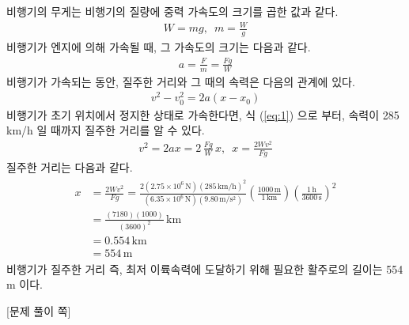\documentclass[floatfix,nofootinbib,superscriptaddress,fleqn,preprint]{revtex4}
\begin{document}
 비행기의 무게는 비행기의 질량에 중력 가속도의 크기를
곱한 값과 같다.
\begin{align}
  W=mg,\,\,\,m=\frac{W}{g}
\end{align}
비행기가 엔지에 의해 가속될 때, 그 가속도의 크기는 다음과 같다.
\begin{align}
  a=\frac{F}{m}=\frac{Fg}{W}
\end{align}
비행기가 가속되는 동안, 질주한 거리와 그 때의 속력은 
다음의 관계에 있다.
\begin{align}\label{eq:1}
 v^2-v^2_0 = 2a(x-x_0) 
\end{align}
비행기가 초기 위치에서 정지한 상태로 가속한다면, 식 (\ref{eq:1}) 으로
부터, 속력이 285 km/h 일 때까지 질주한 거리를 알 수 있다.
\begin{align}
    v^2 = 2ax = 2\,\frac{Fg}{W}\,x,\,\,\,
    x=\frac{2Wv^2}{Fg}
\end{align}
질주한 거리는 다음과 같다.
\begin{align}
  \begin{split}
    x&=\frac{2Wv^2}{Fg}
    =\frac{2(2.75\times 10^6\,\mathrm{N}){(285\,\mathrm{km/h})}^2}
    {(6.35\times 10^6\,\mathrm{N})(9.80\,\mathrm{m/s^2})}
    \left(\frac{1000\,\mathrm{m}}{1\,\mathrm{km}}\right)
    \left(\frac{1\,\mathrm{h}}{3600\,\mathrm{s}}\right)^2 \\
    &=\frac{(7180)(1000)}{(3600)^2}\,\mathrm{km}  \\
    &=0.554\,\mathrm{km} \\
    &= 554\,\mathrm{m}
  \end{split}
\end{align}
비행기가 질주한 거리 즉, 최저 이륙속력에 도달하기 위해 필요한 
활주로의 길이는 554 m 이다.
\newpage

{\color{gray} [문제 풀이 쪽]}

\newpage 
\end{document}
